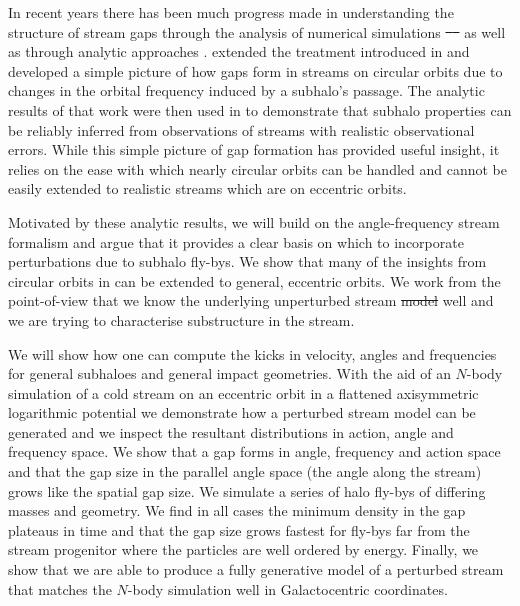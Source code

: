 \documentclass[useAMS,usenatbib,fleqn,a4paper]{mn2e}
\providecommand{\DIFaddtex}[1]{{\protect\color{blue}\uwave{#1}}} %
\providecommand{\DIFdeltex}[1]{{\protect\color{red}\sout{#1}}}                      %
\providecommand{\DIFaddbegin}{} %
\providecommand{\DIFaddend}{} %
\providecommand{\DIFdelbegin}{} %
\providecommand{\DIFdelend}{} %
\providecommand{\DIFadd}[1]{\texorpdfstring{\DIFaddtex{#1}}{#1}} %
\providecommand{\DIFdel}[1]{\texorpdfstring{\DIFdeltex{#1}}{}} %
\begin{document}
In recent years there has been much progress made in understanding the structure of stream gaps through the analysis of numerical simulations \DIFdelbegin \DIFdel{\mbox{%
\citep{SiegalGaskins2008,Carlberg2009,YoonJohnstonHogg,Carlberg2012} }%
}\DIFdelend \DIFaddbegin \DIFadd{\mbox{%
\citep{Johnston2002,Ibata2002,SiegalGaskins2008,Carlberg2009,YoonJohnstonHogg,Carlberg2012} }%
}\DIFaddend as well as through analytic approaches \citep{Carlberg2013,ErkalBelokurov2015,ErkalBelokurov2015b}. \cite{ErkalBelokurov2015} extended the treatment introduced in \cite{Carlberg2013} and developed a simple picture of how gaps form in streams on circular orbits due to changes in the orbital frequency induced by a subhalo's passage. The analytic results of that work were then used in \citet{ErkalBelokurov2015b} to demonstrate that subhalo properties can be reliably inferred from observations of streams with realistic observational errors. While this simple picture of gap formation has provided useful insight, it relies on the ease with which nearly circular orbits can be handled and cannot be easily extended to realistic streams which are on eccentric orbits.

Motivated by these analytic results, we will build on the angle-frequency stream formalism and argue that it provides a clear basis on which to incorporate perturbations due to subhalo fly-bys. We show that many of the insights from circular orbits in \cite{ErkalBelokurov2015} can be extended to general, eccentric orbits. We work from the point-of-view that we know the underlying unperturbed stream \DIFdelbegin \DIFdel{model }\DIFdelend \DIFaddbegin \DIFadd{distribution and the Galactic potential }\DIFaddend well and we are trying to characterise substructure in the stream.

We will show how one can compute the kicks in velocity, angles and frequencies for general subhaloes and general impact geometries. With the aid of an $N$-body simulation of a cold stream on an eccentric orbit in a flattened axisymmetric logarithmic potential we demonstrate how a perturbed stream model can be generated and we inspect the resultant distributions in action, angle and frequency space. We show that a gap forms in angle, frequency and action space and that the gap size in the parallel angle space (the angle along the stream) grows like the spatial gap size. We simulate a series of halo fly-bys of differing masses and geometry. We find in all cases the minimum density in the gap plateaus in time and that the gap size grows fastest for fly-bys far from the stream progenitor where the particles are well ordered by energy. Finally, we show that we are able to produce a fully generative model of a perturbed stream that matches the $N$-body simulation well in Galactocentric coordinates.
\end{document}
